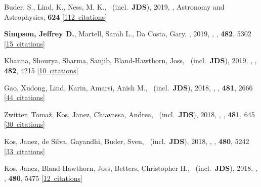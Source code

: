 \item[{\color{numcolor}\scriptsize26}] Buder, S., Lind, K., Ness, M. K., \etal\ (incl.\ \textbf{JDS}), 2019, , Astronomy and Astrophysics, \textbf{624} [\href{https://ui.adsabs.harvard.edu/#abs/2019A&A...624A..19B}{112~citations}]

\item[{\color{numcolor}\scriptsize25}] \textbf{Simpson, Jeffrey D.}, Martell, Sarah L., Da Costa, Gary, \etal, 2019, , \mnras, \textbf{482}, 5302 [\href{https://ui.adsabs.harvard.edu/#abs/2019MNRAS.482.5302S}{15~citations}]

\item[{\color{numcolor}\scriptsize24}] Khanna, Shourya, Sharma, Sanjib, Bland-Hawthorn, Joss, \etal\ (incl.\ \textbf{JDS}), 2019, , \mnras, \textbf{482}, 4215 [\href{https://ui.adsabs.harvard.edu/#abs/2019MNRAS.482.4215K}{10~citations}]

\item[{\color{numcolor}\scriptsize23}] Gao, Xudong, Lind, Karin, Amarsi, Anish M., \etal\ (incl.\ \textbf{JDS}), 2018, , \mnras, \textbf{481}, 2666 [\href{https://ui.adsabs.harvard.edu/#abs/2018MNRAS.481.2666G}{44~citations}]

\item[{\color{numcolor}\scriptsize22}] Zwitter, Toma{\v{z}}, Kos, Janez, Chiavassa, Andrea, \etal\ (incl.\ \textbf{JDS}), 2018, , \mnras, \textbf{481}, 645 [\href{https://ui.adsabs.harvard.edu/#abs/2018MNRAS.481..645Z}{30~citations}]

\item[{\color{numcolor}\scriptsize21}] Kos, Janez, de Silva, Gayandhi, Buder, Sven, \etal\ (incl.\ \textbf{JDS}), 2018, , \mnras, \textbf{480}, 5242 [\href{https://ui.adsabs.harvard.edu/#abs/2018MNRAS.480.5242K}{33~citations}]

\item[{\color{numcolor}\scriptsize20}] Kos, Janez, Bland-Hawthorn, Joss, Betters, Christopher H., \etal\ (incl.\ \textbf{JDS}), 2018, , \mnras, \textbf{480}, 5475 [\href{https://ui.adsabs.harvard.edu/#abs/2018MNRAS.480.5475K}{12~citations}]

